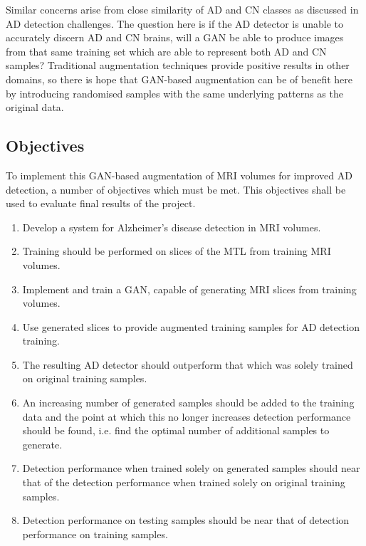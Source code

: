 \documentclass[
    author={Kai Hulme},
    supervisor={Dr Jon Bird},
    degree={BSc},
    title={Generative Adversarial Networks as an Augmentation Technique},
    subtitle={for Alzheimer's Disease Detection in MRI Volumes},
    type={Research},
    year={2021} 
]{dissertation}
\begin{document}
Similar concerns arise from close similarity of AD and CN classes as discussed in AD detection challenges. The question here is if the AD detector is unable to accurately discern AD and CN brains, will a GAN be able to produce images from that same training set which are able to represent both AD and CN samples? Traditional augmentation techniques provide positive results in other domains, \cite{rajeshwari2013efficient} so there is hope that GAN-based augmentation can be of benefit here by introducing randomised samples with the same underlying patterns as the original data.

\subsection{Objectives}

To implement this GAN-based augmentation of MRI volumes for improved AD detection, a number of objectives which must be met. This objectives shall be used to evaluate final results of the project.

\begin{enumerate}
    \item Develop a system for Alzheimer's disease detection in MRI volumes.
    \item Training should be performed on slices of the MTL from training MRI volumes. 
    \item Implement and train a GAN, capable of generating MRI slices from training volumes.
    \item Use generated slices to provide augmented training samples for AD detection training.
    \item The resulting AD detector should outperform that which was solely trained on original training samples.
    \item An increasing number of generated samples should be added to the training data and the point at which this no longer increases detection performance should be found, i.e. find the optimal number of additional samples to generate.
    \item Detection performance when trained solely on generated samples should near that of the detection performance when trained solely on original training samples.
    \item Detection performance on testing samples should be near that of detection performance on training samples.
\end{enumerate}

\end{document}
